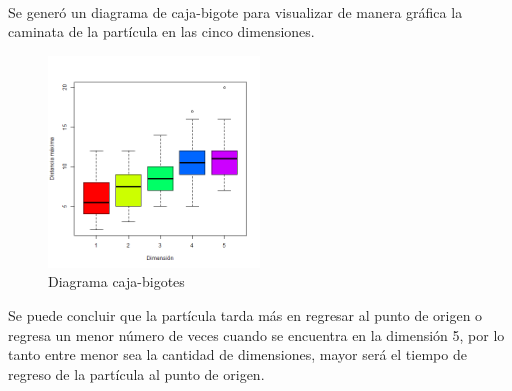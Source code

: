 \documentclass[12pt]{amsart}
\begin{document}
\\
\hvfill
Se generó un diagrama de caja-bigote para visualizar de manera gráfica la caminata de la partícula en las cinco dimensiones.
\begin{figure}[h!]
    \centering
    \includegraphics[width=0.5\textwidth]{p1mr.png}
    \caption{\label{fig1}Diagrama caja-bigotes}
    \label{fig:figura1}
\end{figure}

\bigskip
Se puede concluir que la partícula tarda más en regresar al punto de origen o regresa un menor número de veces cuando se encuentra en la dimensión 5, por lo tanto entre menor sea la cantidad de dimensiones, mayor será el tiempo de regreso de la partícula al punto de origen.
\bigskip





\bigskip
\end{document}
